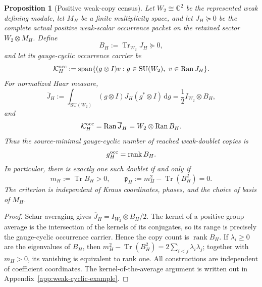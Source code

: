 \documentclass[11pt]{article}
\numberwithin{equation}{section}
\newtheorem{proposition}[theorem]{Proposition}
\theoremstyle{definition}
\theoremstyle{remark}
\newcommand{\C}{\mathbb C}
\newcommand{\dd}{\mathrm d}
\newcommand{\Tr}{\operatorname{Tr}}
\newcommand{\rank}{\operatorname{rank}}
\newcommand{\Ran}{\operatorname{Ran}}
\newcommand{\Span}{\operatorname{span}}
\newcommand{\SU}{\mathrm{SU}}
\begin{document}
\begin{proposition}[Positive weak-copy census]
\label{thm:weak-copy-census}
Let $W_2\cong\C^2$ be the represented weak defining module, let $M_H$ be a
finite multiplicity space, and let $J_H\succeq0$ be the complete actual
positive weak-scalar occurrence packet on the retained sector
$W_2\otimes M_H$.  Define
\begin{equation}
 B_H:=\Tr_{W_2}J_H\succeq0,
 \label{eq:weak-copy-Gram}
\end{equation}
and let its gauge-cyclic occurrence carrier be
\begin{equation}
 \mathcal K_H^{\rm occ}
 :=\Span\{(g\otimes I)v:g\in\SU(W_2),\ v\in\Ran J_H\}.
 \label{eq:weak-gauge-cyclic-carrier}
\end{equation}
For normalized Haar measure,
\begin{equation}
 \overline J_H:=\int_{\SU(W_2)}
 (g\otimes I)J_H(g^*\otimes I)\,\dd g
 =\frac12I_{W_2}\otimes B_H,
 \label{eq:weak-copy-twirl}
\end{equation}
and
\begin{equation}
 \mathcal K_H^{\rm occ}=\Ran\overline J_H
       =W_2\otimes\Ran B_H.
 \label{eq:weak-gauge-cyclic-support}
\end{equation}
Thus the source-minimal gauge-cyclic number of reached weak-doublet copies is
\begin{equation}
 g_H^{\rm occ}=\rank B_H.
 \label{eq:weak-copy-count}
\end{equation}
In particular, there is exactly one such doublet if and only if
\begin{equation}
 m_H:=\Tr B_H>0,\qquad
 \mathfrak p_H:=m_H^2-\Tr(B_H^2)=0.
 \label{eq:one-weak-doublet-test}
\end{equation}
The criterion is independent of Kraus coordinates, phases, and the choice of
basis of $M_H$.
\end{proposition}

\begin{proof}
Schur averaging gives $\overline J_H=I_{W_2}\otimes B_H/2$.
The kernel of a positive group average is the intersection of the kernels
of its conjugates, so its range is precisely the gauge-cyclic occurrence
carrier.  Hence the copy count is $\rank B_H$.  If $\lambda_i\ge0$ are the
eigenvalues of $B_H$, then
$m_H^2-\Tr(B_H^2)=2\sum_{i<j}\lambda_i\lambda_j$; together with $m_H>0$,
its vanishing is equivalent to rank one.  All constructions are independent
of coefficient coordinates.  The kernel-of-the-average argument is written
out in Appendix~\ref{app:weak-cyclic-example}.
\end{proof}
\end{document}
